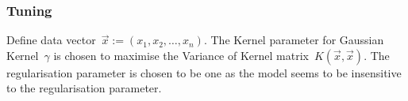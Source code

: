 \documentclass{article} %
\begin{document}
\subsubsection{Tuning}
Define data vector~$\vec{x}:=(x_1,x_2,\ldots , x_n)$. The Kernel parameter for Gaussian Kernel~$\gamma$ is chosen to maximise the Variance of Kernel matrix~$K(\vec{x},\vec{x})$. The regularisation parameter is chosen to be one as the model seems to be insensitive to the regularisation parameter.




\end{document}
